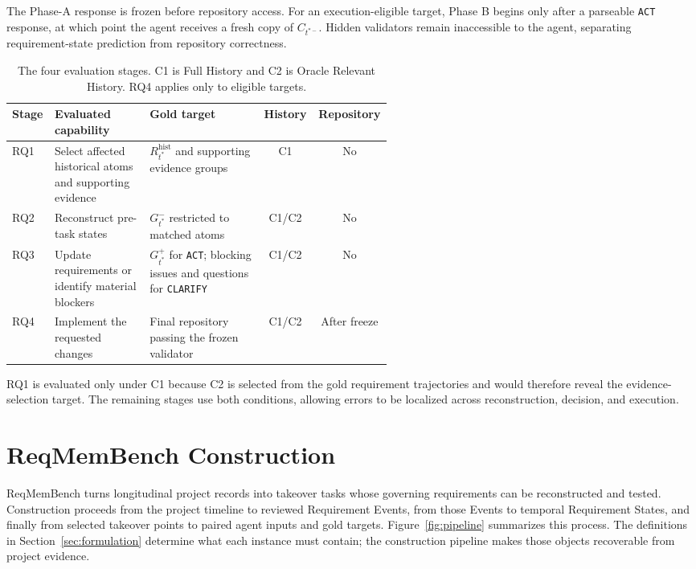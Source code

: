 \documentclass{article} %
\begin{document}
The Phase-A response is frozen before repository access. For an execution-eligible target, Phase B begins only after a parseable \texttt{ACT} response, at which point the agent receives a fresh copy of $C_{t^{*-}}$. Hidden validators remain inaccessible to the agent, separating requirement-state prediction from repository correctness.

\begin{table}[t]
\caption{The four evaluation stages. C1 is Full History and C2 is
Oracle Relevant History. RQ4 applies only to eligible targets.}
\label{tab:evaluation-stages}
\centering
\small
\begin{tabular}{@{}lp{0.25\linewidth}p{0.30\linewidth}cc@{}}
\toprule
Stage & Evaluated capability & Gold target & History & Repository \\
\midrule
RQ1 &
Select affected historical atoms and supporting evidence &
$R^{\mathrm{hist}}_{t^*}$ and supporting evidence groups &
C1 & No \\

RQ2 &
Reconstruct pre-task states &
$G^-_{t^*}$ restricted to matched atoms &
C1/C2 & No \\

RQ3 &
Update requirements or identify material blockers &
$G^+_{t^*}$ for \texttt{ACT}; blocking issues and questions
for \texttt{CLARIFY} &
C1/C2 & No \\

RQ4 &
Implement the requested changes &
Final repository passing the frozen validator &
C1/C2 & After freeze \\
\bottomrule
\end{tabular}
\end{table}

RQ1 is evaluated only under C1 because C2 is selected from the gold requirement trajectories and would therefore reveal the evidence-selection target. The remaining stages use both conditions, allowing errors to be localized across reconstruction, decision, and execution.

\section{ReqMemBench Construction}
\label{sec:construction}

ReqMemBench turns longitudinal project records into takeover tasks whose governing requirements can be reconstructed and tested. Construction proceeds from the project timeline to reviewed Requirement Events, from those Events to temporal Requirement States, and finally from selected takeover points to paired agent inputs and gold targets. Figure~\ref{fig:pipeline} summarizes this process. The definitions in Section~\ref{sec:formulation} determine what each instance must contain; the construction pipeline makes those objects recoverable from project evidence.
\end{document}
